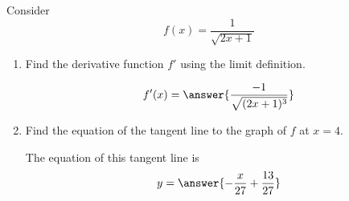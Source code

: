 \documentclass{ximera}
\author{Steven Gubkin}
\begin{document}
\begin{exercise}




Consider 
\[
f(x) = \frac{1}{\sqrt{2x+1}}
\]



\begin{enumerate}
\item Find the derivative function $f'$ using the limit definition.
\begin{prompt} 
\[
f'(x) = \answer{\frac{-1}{\sqrt{(2x+1)^3}}}
\]
\end{prompt}

\item  Find the equation of the tangent line to the graph of $f$ at $x=4$.

\begin{prompt} 
The equation of this tangent line is
$$ y = \answer{ -\frac{x}{27} + \frac{13}{27}}$$ 
\end{prompt}

\end{enumerate}

\end{exercise}
\end{document}
